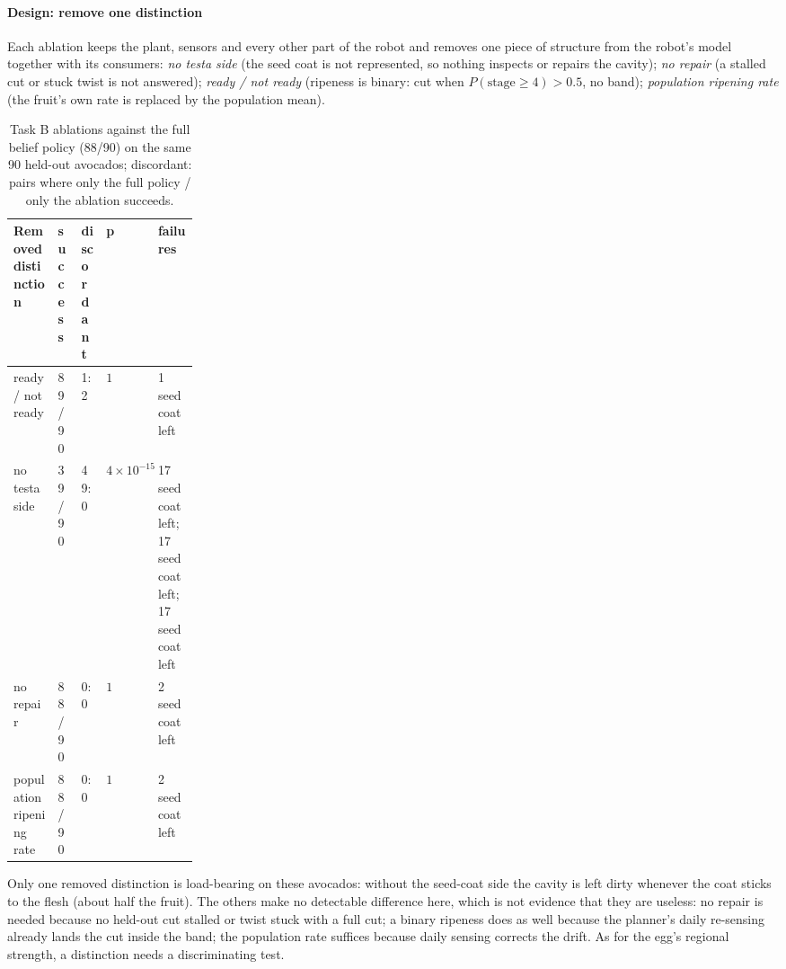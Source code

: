\documentclass[10.5pt,a4paper]{article}
\begin{document}
\paragraph{Design: remove one distinction} Each ablation keeps the plant, sensors and every other part of the robot
and removes one piece of structure from the robot's model together with its consumers: \emph{no testa side} (the seed
coat is not represented, so nothing inspects or repairs the cavity); \emph{no repair} (a stalled cut or stuck twist is
not answered); \emph{ready / not ready} (ripeness is binary: cut when $P(\text{stage}\ge4)>0.5$, no band);
\emph{population ripening rate} (the fruit's own rate is replaced by the population mean).
\begin{table}[htbp]\centering\scriptsize\caption{Task B ablations against the full belief policy (88/90) on the same 90 held-out avocados; discordant: pairs where only the full policy / only the ablation succeeds.}
\begin{tabularx}{\linewidth}{@{}p{0.24\linewidth}lllX@{}}\toprule Removed distinction & success & discordant & p & failures \\\midrule
ready / not ready & 89/90 & 1:2 & $1$ & 1 seed coat left \\
no testa side & 39/90 & 49:0 & $4\times10^{-15}$ & 17 seed coat left; 17 seed coat left; 17 seed coat left \\
no repair & 88/90 & 0:0 & $1$ & 2 seed coat left \\
population ripening rate & 88/90 & 0:0 & $1$ & 2 seed coat left \\\bottomrule\end{tabularx}\end{table}
Only one removed distinction is load-bearing on these avocados: without the seed-coat side the cavity is left
dirty whenever the coat sticks to the flesh (about half the fruit). The others make no detectable difference here,
which is not evidence that they are useless: no repair is needed because no held-out cut stalled or twist stuck with a
full cut; a binary ripeness does as well because the planner's daily re-sensing already lands the cut inside the band;
the population rate suffices because daily sensing corrects the drift. As for the egg's regional strength, a
distinction needs a discriminating test.
\end{document}
